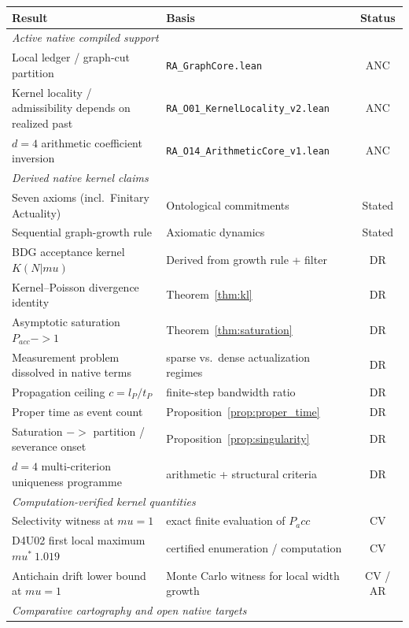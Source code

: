 \documentclass[11pt]{article}
\def\ell{l}%
\def\mu{mu}%
\def\mathrm#1{#1}%
\def\mathbf#1{#1}%
\def\approx{~}%
\def\to{->}%
\def\Pacc{P_acc}%
\newcommand{\Pacc}{P_{\mathrm{acc}}}
\begin{document}
\begin{center}
\begin{tabular}{llc}
\toprule
Result & Basis & Status \\
\midrule
\multicolumn{3}{l}{\textit{Active native compiled support}} \\
Local ledger / graph-cut partition & \texttt{RA\_GraphCore.lean} & ANC \\
Kernel locality / admissibility depends on realized past & \texttt{RA\_O01\_KernelLocality\_v2.lean} & ANC \\
$d=4$ arithmetic coefficient inversion & \texttt{RA\_O14\_ArithmeticCore\_v1.lean} & ANC \\
\midrule
\multicolumn{3}{l}{\textit{Derived native kernel claims}} \\
Seven axioms (incl.\ Finitary Actuality) & Ontological commitments & Stated \\
Sequential graph-growth rule & Axiomatic dynamics & Stated \\
BDG acceptance kernel $K(\mathbf{N}|\mu)$ & Derived from growth rule + filter & DR \\
Kernel--Poisson divergence identity & Theorem~\ref{thm:kl} & DR \\
Asymptotic saturation $P_{\mathrm{acc}}\to 1$ & Theorem~\ref{thm:saturation} & DR \\
Measurement problem dissolved in native terms & sparse vs.\ dense actualization regimes & DR \\
Propagation ceiling $c=\ell_P/t_P$ & finite-step bandwidth ratio & DR \\
Proper time as event count & Proposition~\ref{prop:proper_time} & DR \\
Saturation $\to$ partition / severance onset & Proposition~\ref{prop:singularity} & DR \\
$d=4$ multi-criterion uniqueness programme & arithmetic + structural criteria & DR \\
\midrule
\multicolumn{3}{l}{\textit{Computation-verified kernel quantities}} \\
Selectivity witness at $\mu=1$ & exact finite evaluation of $\Pacc$ & CV \\
D4U02 first local maximum $\mu^*\approx 1.019$ & certified enumeration / computation & CV \\
Antichain drift lower bound at $\mu=1$ & Monte Carlo witness for local width growth & CV / AR \\
\midrule
\multicolumn{3}{l}{\textit{Comparative cartography and open native targets}} \\

\end{tabular}
\end{center}
\end{document}
